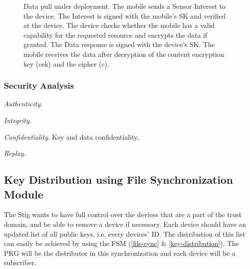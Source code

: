 \begin{figure}[H]
  \caption{Data pull under deployment. 
  The mobile sends a Sensor Interest to the device. 
  The Interest is signed with the mobile's SK and verified at the device. 
  The device checks whether the mobile has a valid capability for the requested resource and encrypts the data if granted.
  The Data response is signed with the device's SK.
  The mobile receives the data after decryption of the content encryption key (cek) and the cipher (c).}
  \label{fig:data_pull_ibe}
\end{figure}


\subsubsection{Security Analysis}

\textit{Authenticity}.

\textit{Integrity}.

\textit{Confidentiality}. Key and data confidentiality.

\textit{Replay}.

\subsection{Key Distribution using File Synchronization Module}

The Stig wants to have full control over the devices that are a part of the trust domain, and be able to remove a device if necessary.
Each device should have an updated list of all public keys, i.e. every devices' \gls{ID}.
The distribution of this list can easily be achieved by using the \gls{FSM} (\autoref{file-sync} \& \autoref{key-distribution}).
The \gls{PKG} will be the distributor in this synchronization and each device will be a subscriber.


